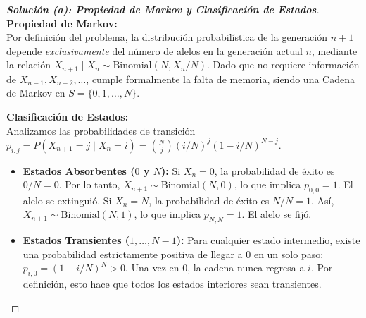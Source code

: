 \documentclass[10pt,a4paper]{article}
\begin{document}
\vspace{2mm}

\begin{proof}[\textbf{Solución (a): Propiedad de Markov y Clasificación de Estados}]
    \textbf{Propiedad de Markov:} \\
    Por definición del problema, la distribución probabilística de la generación $n+1$ depende \textit{exclusivamente} del número de alelos en la generación actual $n$, mediante la relación $X_{n+1} \mid X_n \sim \text{Binomial}(N, X_n/N)$. Dado que no requiere información de $X_{n-1}, X_{n-2}, \dots$, cumple formalmente la falta de memoria, siendo una Cadena de Markov en $S = \{0, 1, \dots, N\}$.
    
    \textbf{Clasificación de Estados:} \\
    Analizamos las probabilidades de transición $p_{i,j} = P(X_{n+1} = j \mid X_n = i) = \binom{N}{j} (i/N)^j (1 - i/N)^{N-j}$.
    \begin{itemize}
        \item \textbf{Estados Absorbentes ($0$ y $N$):} 
        Si $X_n = 0$, la probabilidad de éxito es $0/N = 0$. Por lo tanto, $X_{n+1} \sim \text{Binomial}(N, 0)$, lo que implica $p_{0,0} = 1$. El alelo se extinguió.
        Si $X_n = N$, la probabilidad de éxito es $N/N = 1$. Así, $X_{n+1} \sim \text{Binomial}(N, 1)$, lo que implica $p_{N,N} = 1$. El alelo se fijó.
        \item \textbf{Estados Transientes ($1, \dots, N-1$):}
        Para cualquier estado intermedio, existe una probabilidad estrictamente positiva de llegar a $0$ en un solo paso: $p_{i,0} = (1 - i/N)^N > 0$. Una vez en $0$, la cadena nunca regresa a $i$. Por definición, esto hace que todos los estados interiores sean transientes.
    \end{itemize}
\end{proof}

\vspace{5mm}
\end{document}
